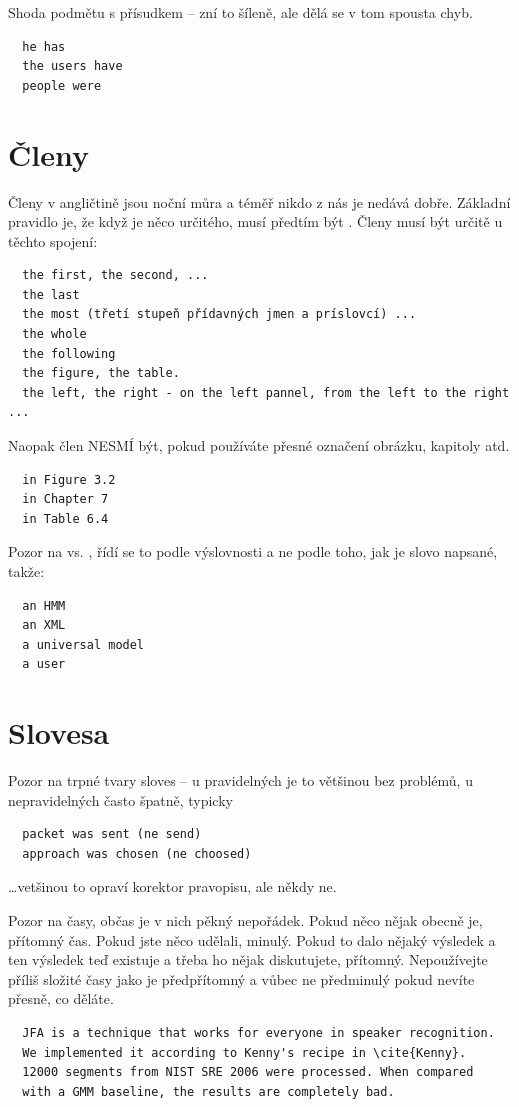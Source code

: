 \noindent Shoda podmětu s přísudkem -- zní to šíleně, ale dělá se v tom spousta chyb. 

\begin{verbatim}
  he has 
  the users have 
  people were 
\end{verbatim}

\section*{Členy}

Členy v angličtině jsou noční můra a téměř nikdo z nás je nedává dobře. Základní pravidlo je, že když je něco určitého, musí předtím být . Členy musí být určitě u těchto spojení:
\begin{verbatim}
  the first, the second, ...
  the last
  the most (třetí stupeň přídavných jmen a príslovcí) ...
  the whole 
  the following 
  the figure, the table. 
  the left, the right - on the left pannel, from the left to the right ... 
\end{verbatim}

\noindent Naopak člen NESMÍ být, pokud používáte přesné označení obrázku, kapitoly atd.
\begin{verbatim}
  in Figure 3.2
  in Chapter 7
  in Table 6.4
\end{verbatim}

\begin{samepage}
\noindent Pozor na  vs. , řídí se to podle výslovnosti a ne podle toho, jak je slovo napsané, takže:
\begin{verbatim}
  an HMM
  an XML
  a universal model
  a user
\end{verbatim}
\end{samepage}

\section*{Slovesa}

Pozor na trpné tvary sloves -- u pravidelných je to většinou bez problémů, u nepravidelných často špatně, typicky
\begin{verbatim}
  packet was sent (ne send)
  approach was chosen (ne choosed)
\end{verbatim}
\noindent \ldots vetšinou to opraví korektor pravopisu, ale někdy ne. 

Pozor na časy, občas je v nich pěkný nepořádek. Pokud něco nějak obecně je, přítomný čas. Pokud jste něco udělali, minulý. Pokud to dalo nějaký výsledek a ten výsledek teď existuje a třeba ho nějak diskutujete, přítomný. Nepoužívejte příliš složité časy jako je předpřítomný a vůbec ne předminulý pokud nevíte přesně, co děláte.
\begin{verbatim}
  JFA is a technique that works for everyone in speaker recognition. 
  We implemented it according to Kenny's recipe in \cite{Kenny}. 
  12000 segments from NIST SRE 2006 were processed. When compared 
  with a GMM baseline, the results are completely bad. 
\end{verbatim}

